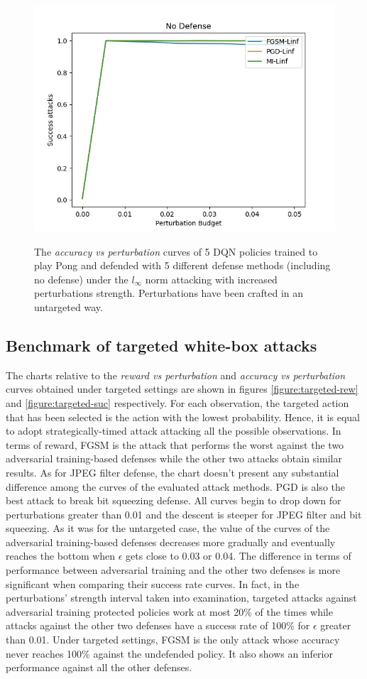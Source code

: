 \begin{figure}
    {\includegraphics[width=0.49\linewidth]{images/exp3/untargeted/No_Defense_succ.jpg}}
  \caption{The {\it accuracy vs perturbation} curves of 5 DQN policies trained to play Pong and defended with 5 different defense methods (including no defense) under the \(l_\infty\) norm attacking with increased perturbations strength. Perturbations have been crafted in an untargeted way.}
  \label{figure:untargeted-suc}
\end{figure}

\subsection{Benchmark of targeted white-box attacks}
The charts relative to the {\it reward vs perturbation} and {\it accuracy vs perturbation} curves obtained under targeted settings are shown in figures \ref{figure:targeted-rew} and \ref{figure:targeted-suc} respectively. For each observation, the targeted action that has been selected is the action with the lowest probability. Hence, it is equal to adopt strategically-timed attack attacking all the possible observations. In terms of reward, FGSM is the attack that performs the worst against the two adversarial training-based defenses while the other two attacks obtain similar results. As for JPEG filter defense, the chart doesn't present any substantial difference among the curves of the evaluated attack methods. PGD is also the best attack to break bit squeezing defense. All curves begin to drop down for perturbations greater than 0.01 and the descent is steeper for JPEG filter and bit squeezing. As it was for the untargeted case, the value of the curves of the adversarial training-based defenses decreases more gradually and eventually reaches the bottom when \(\epsilon\) gets close to 0.03 or 0.04. The difference in terms of performance between adversarial training and the other two defenses is more significant when comparing their success rate curves. In fact, in the perturbations' strength interval taken into examination, targeted attacks against adversarial training protected policies work at most 20\% of the times while attacks against the other two defenses have a success rate of 100\% for \(\epsilon\) greater than 0.01. Under targeted settings, FGSM is the only attack whose accuracy never reaches 100\% against the undefended policy. It also shows an inferior performance against all the other defenses.


